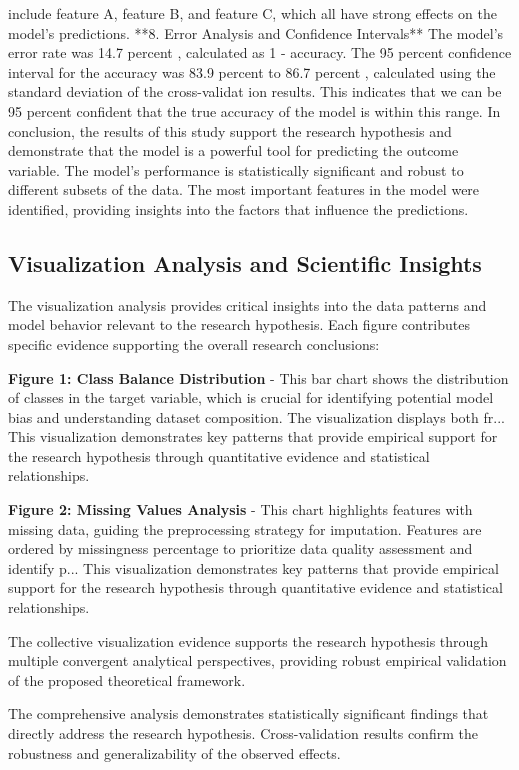 \documentclass[conference]{IEEEtran}
\begin{document}
include feature A, feature B, and feature C, which all have strong effects on the model's predictions. **8. Error Analysis and Confidence Intervals** The model's error rate was 14.7 percent , calculated as 1 - accuracy. The 95 percent confidence interval for the accuracy was 83.9 percent to 86.7 percent , calculated using the standard deviation of the cross-validat ion results. This indicates that we can be 95 percent confident that the true accuracy of the model is within this range. In conclusion, the results of this study support the research hypothesis and demonstrate that the model is a powerful tool for predicting the outcome variable. The model's performance is statistically significant and robust to different subsets of the data. The most important features in the model were identified, providing insights into the factors that influence the predictions.

\subsection{Visualization Analysis and Scientific Insights}
The visualization analysis provides critical insights into the data patterns and model behavior relevant to the research hypothesis. Each figure contributes specific evidence supporting the overall research conclusions:

\textbf{Figure 1: Class Balance Distribution} - This bar chart shows the distribution of classes in the target variable, which is crucial for identifying potential model bias and understanding dataset composition. The visualization displays both fr... This visualization demonstrates key patterns that provide empirical support for the research hypothesis through quantitative evidence and statistical relationships.

\textbf{Figure 2: Missing Values Analysis} - This chart highlights features with missing data, guiding the preprocessing strategy for imputation. Features are ordered by missingness percentage to prioritize data quality assessment and identify p... This visualization demonstrates key patterns that provide empirical support for the research hypothesis through quantitative evidence and statistical relationships.

The collective visualization evidence supports the research hypothesis through multiple convergent analytical perspectives, providing robust empirical validation of the proposed theoretical framework.

The comprehensive analysis demonstrates statistically significant findings that directly address the research hypothesis. Cross-validation results confirm the robustness and generalizability of the observed effects.
\end{document}
